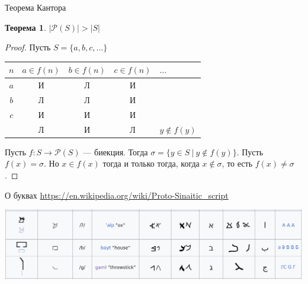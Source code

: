 \documentclass[aspectratio=169]{beamer}
\newtheorem{thm}{Теорема}[section]
\begin{document}
\begin{frame}{Теорема Кантора}
\begin{thm}$|\mathcal{P}(S)| > |S|$\end{thm}
\begin{proof}Пусть $S = \{a,b,c,\dots\}$

\begin{center}\begin{tabular}{c|cccl}
$n$ & $a \in f(n)$ & $b \in f(n)$ & $c \in f(n)$ & $\dots$ \\\hline
$a$ & \color{red}И & Л & И \\
$b$ &       Л & \color{red}Л& И \\
$c$ &   И & И & \color{red}И\\\hline
   & Л & И & Л & $y \notin f(y)$
\end{tabular}\end{center}\pause

Пусть $f: S \rightarrow \mathcal{P}(S)$ --- биекция. Тогда 
$\sigma = \{ y\in S\ |\ y\notin f(y)\}$. Пусть $f(x) = \sigma$.
Но $x \in f(x)$ тогда и только тогда, когда $x \notin \sigma$, то есть $f(x) \ne \sigma$.
\end{proof}
\end{frame}

\begin{frame}{О буквах}
\small\url{https://en.wikipedia.org/wiki/Proto-Sinaitic_script}
\begin{center}\includegraphics[scale=0.6]{letters}\end{center}
\end{frame}
\end{document}

